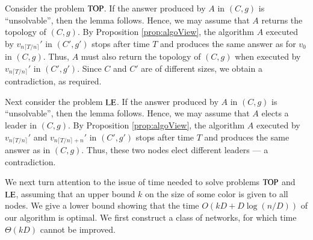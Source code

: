 \documentclass[a4paper,10pt]{article}
\newcommand{\problemLE}{\textup{LE}}
\newcommand{\problemTOP}{\textup{TOP}}
\newenvironment{proof}[1][Proof]
{\par\noindent{\bf #1:} }{\hspace*{\fill}\nolinebreak{$\Box$}\bigskip\par}
\begin{document}
\begin{proof}
Consider the problem $\problemTOP$.
If the answer produced by $A$ in $(C,g)$ is ``unsolvable'', then the lemma follows.
Hence, we may assume that $A$ returns the topology of $(C,g)$.
By Proposition \ref{prop:algoView}, the algorithm $A$ executed by $v_{n \lceil T/n\rceil}'$ in $(C',g')$ stops after time $T$ and produces the same answer as for $v_0$ in $(C,g)$.
Thus, $A$ must also return the topology of $(C,g)$ when executed by $v_{n\lceil T/n\rceil}'$ in $(C',g')$.
Since $C$ and $C'$ are of different sizes, we obtain a contradiction, as required.

Next consider the problem $\problemLE$.
If the answer produced by $A$ in $(C,g)$ is ``unsolvable'', then the lemma follows.
Hence, we may assume that $A$ elects a leader in $(C,g)$.
By Proposition \ref{prop:algoView}, the algorithm $A$ executed by $v_{n \lceil T/n\rceil}'$ and $v_{n \lceil T/n\rceil+n}'$ in $(C',g')$ stops after time $T$ and produces the same answer as in $(C,g)$.
Thus, these two nodes elect different leaders --- a contradiction.
\end{proof}


We next turn attention to the issue of time needed to solve problems $\problemTOP$ and $\problemLE$, assuming that an upper bound $k$ on the size of some color is given to all nodes.  We give a lower bound showing that the time
$O(kD+D\log(n/D))$ of our algorithm is optimal.
We first construct a class of networks, for which
time $\Theta(kD)$ cannot be improved.
\end{document}
